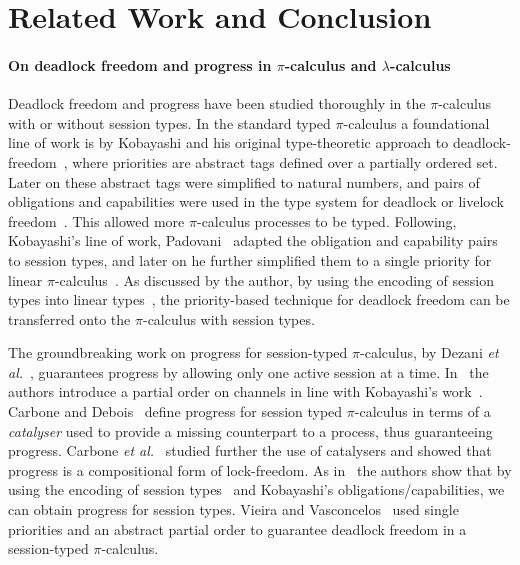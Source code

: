\documentclass[main.tex]{subfiles}
\begin{document}
\section{Related Work and Conclusion}

\paragraph{On deadlock freedom and progress in $\pi$-calculus and $\lambda$-calculus}
Deadlock freedom and progress have been studied thoroughly in the $\pi$-calculus with or without session types.
In the standard typed $\pi$-calculus a foundational line of work is by Kobayashi and his original type-theoretic approach to deadlock-freedom~\cite{kobayashi98}, where priorities are abstract tags defined over a partially ordered set. Later on these abstract tags were simplified to natural numbers, and pairs of obligations and capabilities were used in the type system for deadlock or livelock freedom~\cite{kobayashi02,kobayashi06}. This allowed more $\pi$-calculus processes to be typed. Following, Kobayashi's line of work, Padovani~\cite{padovani13} adapted the obligation and capability pairs to session types, and later on he further simplified them to a single priority for linear $\pi$-calculus~\cite{padovani14}. As discussed by the author, by using the encoding of session types into linear types~\cite{kobayashi07,dardhagiachino12,dardha14beat,dardha16}, the priority-based technique for deadlock freedom can be transferred onto the $\pi$-calculus with session types.

The groundbreaking work on progress for session-typed $\pi$-calculus, by Dezani \emph{et al.}~\cite{dezani-ciancaglinimostrous06}, guarantees progress by allowing only one active session at a time. In~\cite{dezani-ciancagliniliguoro09progress} the authors introduce a partial order on channels in line with Kobayashi's work~\cite{kobayashi98}. Carbone and Debois~\cite{carbonedebois10} define progress for session typed $\pi$-calculus in terms of a \emph{catalyser} used to provide a missing counterpart to a process, thus guaranteeing progress.
Carbone \emph{et al.}~\cite{carbonedardha14} studied further the use of catalysers and showed that progress is a compositional form of lock-freedom. As in~\cite{padovani14} the authors show that by using the encoding of session types~\cite{dardhagiachino12} and Kobayashi's obligations/capabilities, we can obtain progress for session types. Vieira and Vasconcelos~\cite{vieiravasconcelos13} used single priorities and an abstract partial order to guarantee deadlock freedom in a session-typed $\pi$-calculus.
\end{document}
